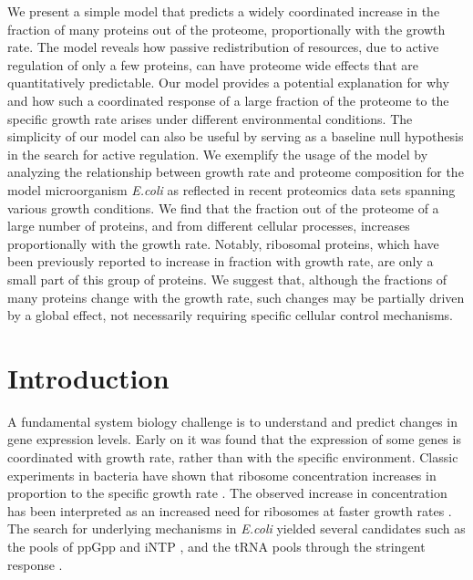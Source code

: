 \documentclass[10pt,letterpaper]{article}
\begin{document}
We present a simple model that predicts a widely coordinated increase in the fraction of many proteins out of the proteome, proportionally with the growth rate.
The model reveals how passive redistribution of resources, due to active regulation of only a few proteins, can have proteome wide effects that are quantitatively predictable.
Our model provides a potential explanation for why and how such a coordinated response of a large fraction of the proteome to the specific growth rate arises under different environmental conditions.
The simplicity of our model can also be useful by serving as a baseline null hypothesis in the search for active regulation.
We exemplify the usage of the model by analyzing the relationship between growth rate and proteome composition for the model microorganism \emph{E.coli} as reflected in recent proteomics data sets spanning various growth conditions.
We find that the fraction out of the proteome of a large number of proteins, and from different cellular processes, increases proportionally with the growth rate.
Notably, ribosomal proteins, which have been previously reported to increase in fraction with growth rate, are only a small part of this group of proteins.
We suggest that, although the fractions of many proteins change with the growth rate, such changes may be partially driven by a global effect, not necessarily requiring specific cellular control mechanisms.

\section*{Introduction}
A fundamental system biology challenge is to understand and predict changes in gene expression levels.
Early on it was found that the expression of some genes is coordinated with growth rate, rather than with the specific environment.
Classic experiments in bacteria have shown that ribosome concentration increases in proportion to the specific growth rate \cite{Schaechter1958}.
The observed increase in concentration has been interpreted as an increased need for ribosomes at faster growth rates \cite{Neidhardt1999,Dennis2004,Zaslaver2009,Molenaar2009}.
The search for underlying mechanisms in \emph{E.coli} yielded several candidates \cite{Nomura1984} such as the pools of ppGpp and iNTP \cite{Murray_2003,Bosdriesz_2015}, and the tRNA pools through the stringent response \cite{Chatterji2001,Brauer2008a}.
\end{document}
